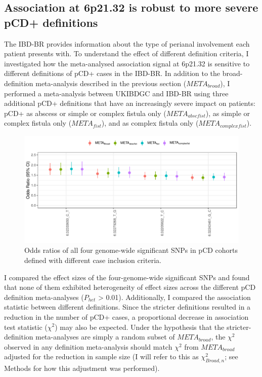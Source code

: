     \subsection{Association at 6p21.32 is robust to more severe pCD+ definitions}


The IBD-BR provides information about the type of perianal involvement each patient presents with. To understand the effect of different definition criteria, I investigated how the meta-analysed association signal at 6p21.32 is sensitive to different definitions of pCD+ cases in the IBD-BR. In addition to the broad-definition meta-analysis described in the previous section ($META_{broad}$), I performed a meta-analysis between UKIBDGC and IBD-BR using three additional pCD+ definitions that have an increasingly severe impact on patients: pCD+ as abscess or simple or complex fistula only ($META_{abscfist}$), as simple or complex fistula only ($META_{fist}$), and as complex fistula only ($META_{complexfist}$). 

\begin{figure}[H] 
  \centering    
  \includegraphics[width=1.0\textwidth]{pcd_def_or_plot}
  \caption[Figure]{Odds ratios of all four genome-wide significant SNPs in pCD cohorts defined with different case inclusion criteria.}
  \label{fig:pcd_def_or_plot}
  \end{figure}


I compared the effect sizes of the four-genome-wide significant SNPs and found that none of them exhibited heterogeneity of effect sizes across the different pCD definition meta-analyses ($P_{het}$ > 0.01). Additionally, I compared the association statistic between different definitions. Since the stricter definitions resulted in a reduction in the number of pCD+ cases, a proportional decrease in association test statistic ($\chi^{2}$) may also be expected. Under the hypothesis that the stricter-definition meta-analyses are simply a random subset of $META_{broad}$, the $\chi^{2}$  observed in any definition meta-analysis should match $\chi^{2}$ from $META_{broad}$ adjusted for the reduction in sample size (I will refer to this as $\chi^{2}_{Broad,n}$; see Methods for how this adjustment was performed). 

